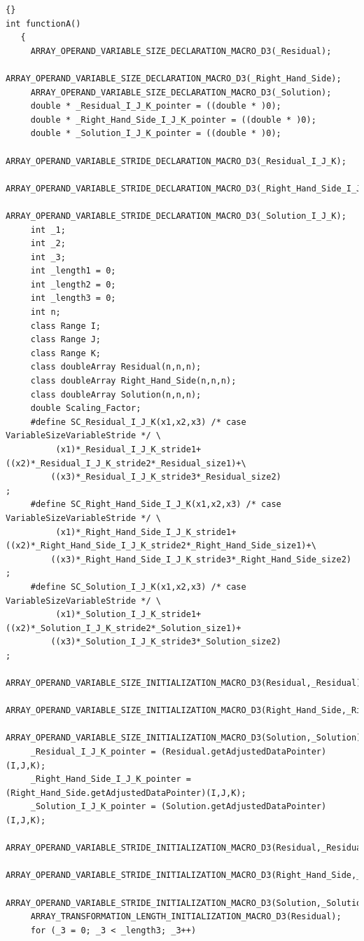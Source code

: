 \documentclass[10pt]{article}
\begin{document}
\begin{lstlisting}{}
int functionA()
   { 
     ARRAY_OPERAND_VARIABLE_SIZE_DECLARATION_MACRO_D3(_Residual); 
     ARRAY_OPERAND_VARIABLE_SIZE_DECLARATION_MACRO_D3(_Right_Hand_Side); 
     ARRAY_OPERAND_VARIABLE_SIZE_DECLARATION_MACRO_D3(_Solution); 
     double * _Residual_I_J_K_pointer = ((double * )0); 
     double * _Right_Hand_Side_I_J_K_pointer = ((double * )0); 
     double * _Solution_I_J_K_pointer = ((double * )0); 
     ARRAY_OPERAND_VARIABLE_STRIDE_DECLARATION_MACRO_D3(_Residual_I_J_K); 
     ARRAY_OPERAND_VARIABLE_STRIDE_DECLARATION_MACRO_D3(_Right_Hand_Side_I_J_K); 
     ARRAY_OPERAND_VARIABLE_STRIDE_DECLARATION_MACRO_D3(_Solution_I_J_K); 
     int _1; 
     int _2; 
     int _3; 
     int _length1 = 0; 
     int _length2 = 0; 
     int _length3 = 0;
     int n;
     class Range I; 
     class Range J;
     class Range K;
     class doubleArray Residual(n,n,n);
     class doubleArray Right_Hand_Side(n,n,n);
     class doubleArray Solution(n,n,n);
     double Scaling_Factor; 
     #define SC_Residual_I_J_K(x1,x2,x3) /* case VariableSizeVariableStride */ \
          (x1)*_Residual_I_J_K_stride1+((x2)*_Residual_I_J_K_stride2*_Residual_size1)+\
         ((x3)*_Residual_I_J_K_stride3*_Residual_size2)
;
     #define SC_Right_Hand_Side_I_J_K(x1,x2,x3) /* case VariableSizeVariableStride */ \
          (x1)*_Right_Hand_Side_I_J_K_stride1+((x2)*_Right_Hand_Side_I_J_K_stride2*_Right_Hand_Side_size1)+\
         ((x3)*_Right_Hand_Side_I_J_K_stride3*_Right_Hand_Side_size2)
;
     #define SC_Solution_I_J_K(x1,x2,x3) /* case VariableSizeVariableStride */ \
          (x1)*_Solution_I_J_K_stride1+((x2)*_Solution_I_J_K_stride2*_Solution_size1)+
         ((x3)*_Solution_I_J_K_stride3*_Solution_size2)
; 
     ARRAY_OPERAND_VARIABLE_SIZE_INITIALIZATION_MACRO_D3(Residual,_Residual); 
     ARRAY_OPERAND_VARIABLE_SIZE_INITIALIZATION_MACRO_D3(Right_Hand_Side,_Right_Hand_Side); 
     ARRAY_OPERAND_VARIABLE_SIZE_INITIALIZATION_MACRO_D3(Solution,_Solution); 
     _Residual_I_J_K_pointer = (Residual.getAdjustedDataPointer)(I,J,K); 
     _Right_Hand_Side_I_J_K_pointer = (Right_Hand_Side.getAdjustedDataPointer)(I,J,K); 
     _Solution_I_J_K_pointer = (Solution.getAdjustedDataPointer)(I,J,K); 
     ARRAY_OPERAND_VARIABLE_STRIDE_INITIALIZATION_MACRO_D3(Residual,_Residual_I_J_K); 
     ARRAY_OPERAND_VARIABLE_STRIDE_INITIALIZATION_MACRO_D3(Right_Hand_Side,_Right_Hand_Side_I_J_K); 
     ARRAY_OPERAND_VARIABLE_STRIDE_INITIALIZATION_MACRO_D3(Solution,_Solution_I_J_K); 
     ARRAY_TRANSFORMATION_LENGTH_INITIALIZATION_MACRO_D3(Residual); 
     for (_3 = 0; _3 < _length3; _3++)

\end{lstlisting}
\end{document}
